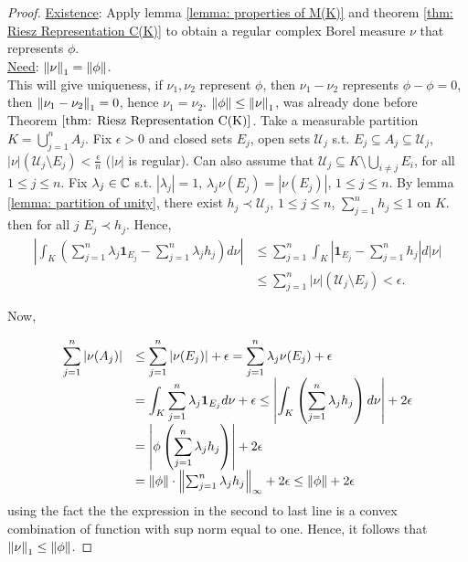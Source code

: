 \documentclass{article}
\begin{document}
\begin{proof}
    \noindent\underline{Existence}: Apply lemma \ref{lemma: properties of M(K)} and theorem \ref{thm: Riesz Representation C(K)} to obtain a regular complex Borel measure $\nu$ that represents $\phi$.\\

    \noindent\underline{Need}: $\left\lVert\nu\right\rVert_1=\left\lVert\phi\right\rVert$.\\
    
     This will give uniqueness, if $\nu_1, \nu_2$ represent $\phi$, then $\nu_1-\nu_2$ represents $\phi-\phi=0$, then $\left\lVert\nu_1-\nu_2\right\rVert_1=0$, hence $\nu_1=\nu_2$. $\left\lVert\phi\right\rVert\leq \left\lVert\nu\right\rVert_1$, was already done before Theorem $\ref{thm: Riesz Representation C(K)}$. Take a measurable partition $K = \displaystyle\bigcup^n_{j=1}A_j$. Fix $\epsilon>0$ and closed sets $E_j$, open sets $\mathcal{U}_j$ s.t. $E_j\subseteq A_j\subseteq \mathcal{U}_j$, $|\nu|(\mathcal{U}_j\setminus E_j)<\frac{\epsilon}{n}$ ($|\nu|$ is regular). Can also assume that $\mathcal{U}_j\subseteq K\setminus \displaystyle\bigcup_{i\neq j}E_i$, for all $1\leq j \leq n$. Fix $\lambda_j\in\mathbb{C}$ s.t. $|\lambda_j|=1$, $\lambda_j\nu(E_j)=|\nu(E_j)|$, $1\leq j \leq n$. By lemma \ref{lemma: partition of unity}, there exist $h_j \prec \mathcal{U}_j$, $1\leq j \leq n$, $\displaystyle \sum_{j=1}^n h_j\leq 1 $ on $K$. then for all $j$ $E_j\prec h_j$. Hence, 
    $$
    \begin{array}{ll}
        \displaystyle\left|\int_K \left(\sum^n_{j=1}\lambda_j\mathbf{1}_{E_j}-\sum^n_{j=1}\lambda_jh_j\right)d\nu\right|
        &\leq \displaystyle \sum^n_{j=1}\int_K |\mathbf{1}_{E_j}-\sum^n_{j=1}h_j|d|\nu|\\
        &\leq \displaystyle \sum^n_{j=1} |\nu|(\mathcal{U}_j\setminus E_j)<\epsilon.
    \end{array}
    $$

    Now, 

    $$
    \begin{array}{ll}
        \displaystyle \sum^n_{j=1} |\nu(A_j)|
        &\leq \displaystyle \sum^n_{j=1} |\nu( E_j)|+\epsilon=\displaystyle \sum^n_{j=1} \lambda_j\nu( E_j)+\epsilon\\
        &= \displaystyle \int_K \sum^n_{j=1} \lambda_j\mathbf{1}_{E_j}d\nu+\epsilon \leq \displaystyle\left|\int_K \left(\sum^n_{j=1}\lambda_jh_j\right)d\nu\right|+2\epsilon\\
        &= \displaystyle\left|\phi \left(\sum^n_{j=1}\lambda_jh_j\right)\right|+2\epsilon\\\
        &= \left\lVert\phi\right\rVert\cdot \left\lVert\sum^n_{j=1}\lambda_jh_j\right\rVert_\infty+2\epsilon \leq \left\lVert\phi\right\rVert+2\epsilon
    \end{array}
    $$
    using the fact the the expression in the second to last line is a convex combination of function with sup norm equal to one. Hence, it follows that $\left\lVert\nu\right\rVert_1\leq \left\lVert\phi\right\rVert$.
\end{proof}
\end{document}
